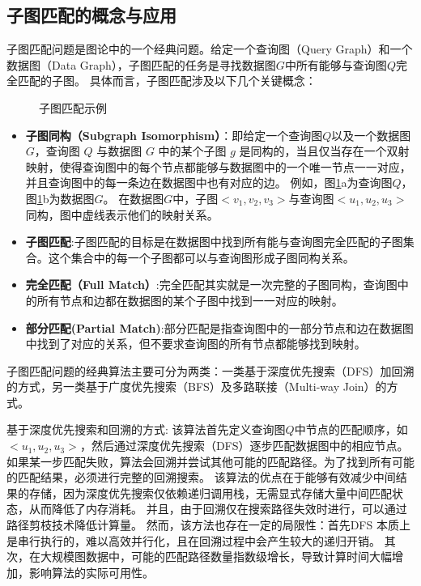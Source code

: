 \subsection{子图匹配的概念与应用}
子图匹配问题是图论中的一个经典问题\cite{sm-ullmann-DBLP:journals/jacm/Ullmann76}。给定一个查询图（Query Graph）和一个数据图（Data Graph），子图匹配的任务是寻找数据图$G$中所有能够与查询图$Q$完全匹配的子图。
具体而言，子图匹配涉及以下几个关键概念：
\begin{figure}[h!]
    \centering
    \caption{子图匹配示例}
    \label{fig:example_subgraph_matching}
\end{figure}
\begin{itemize}
    \item \textbf{子图同构（Subgraph Isomorphism）}：即给定一个查询图$Q$以及一个数据图$G$，查询图 $Q$ 与数据图 $G$ 中的某个子图 $g$ 是同构的，当且仅当存在一个双射映射，使得查询图中的每个节点都能够与数据图中的一个唯一节点一一对应，并且查询图中的每一条边在数据图中也有对应的边。
    例如，图\ref{fig:example_subgraph_matching}a为查询图$Q$，图\ref{fig:example_subgraph_matching}b为数据图$G$。
    在数据图$G$中，子图$<v_1,v_2,v_3>$与查询图$<u_1,u_2,u_3>$同构，图中虚线表示他们的映射关系。
    \item \textbf{子图匹配}:子图匹配的目标是在数据图中找到所有能与查询图完全匹配的子图集合。这个集合中的每一个子图都可以与查询图形成子图同构关系。
    \item \textbf{完全匹配（Full Match）}:完全匹配其实就是一次完整的子图同构，查询图中的所有节点和边都在数据图的某个子图中找到一一对应的映射。
    \item \textbf{部分匹配(Partial Match)}:部分匹配是指查询图中的一部分节点和边在数据图中找到了对应的关系，但不要求查询图的所有节点都能够找到映射。
\end{itemize}


子图匹配问题的经典算法主要可分为两类：一类基于深度优先搜索（DFS）加回溯的方式\cite{sm-ullmann-DBLP:journals/jacm/Ullmann76}，另一类基于广度优先搜索（BFS）及多路联接（Multi-way Join）的方式\cite{sm-bfs-DBLP:conf/focs/AtseriasGM08}。

基于深度优先搜索和回溯的方式: 该算法首先定义查询图$Q$中节点的匹配顺序，如$<u_1, u_2, u_3>$，然后通过深度优先搜索（DFS）逐步匹配数据图中的相应节点。
如果某一步匹配失败，算法会回溯并尝试其他可能的匹配路径。为了找到所有可能的匹配结果，必须进行完整的回溯搜索。
该算法的优点在于能够有效减少中间结果的存储，因为深度优先搜索仅依赖递归调用栈，无需显式存储大量中间匹配状态，从而降低了内存消耗。
并且，由于回溯仅在搜索路径失效时进行，可以通过路径剪枝技术降低计算量。
然而，该方法也存在一定的局限性：首先DFS 本质上是串行执行的，难以高效并行化，且在回溯过程中会产生较大的递归开销。
其次，在大规模图数据中，可能的匹配路径数量指数级增长，导致计算时间大幅增加，影响算法的实际可用性。

